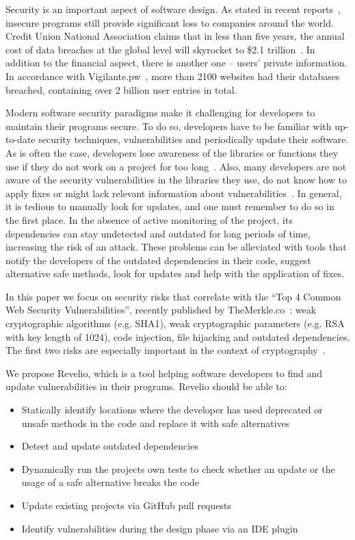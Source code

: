 Security is an important aspect of software design. As stated in recent reports~\cite{kaspersky}, insecure programs still provide significant loss to companies around the world. Credit Union National Association claims that in less than five years, the annual cost of data breaches at the global level will skyrocket to \$2.1 trillion~\cite{juniper}. In addition to the financial aspect, there is another one -- users' private information. In accordance with Vigilante.pw~\cite{vigilantpw}, more than 2100 websites had their databases breached, containing over 2 billion user entries in total.

Modern software security paradigms make it challenging for developers to maintain their programs secure. To do so, developers have to be familiar with up-to-date security techniques, vulnerabilities and periodically update their software.
As is often the case, developers lose awareness of the libraries or functions they use if they do not work on a project for too long~\cite{kula2018developers}. Also, many developers are not aware of the security vulnerabilities in the libraries they use, do not know how to apply fixes or might lack relevant information about vulnerabilities~\cite{cloudpassage}. In general, it is tedious to manually look for updates, and one must remember to do so in the first place. In the absence of active monitoring of the project, its dependencies can stay undetected and outdated for long periods of time, increasing the risk of an attack.
These problems can be alleviated with tools that notify the developers of the outdated dependencies in their code, suggest alternative safe methods, look for updates and help with the application of fixes.

In this paper we focus on security risks that correlate with the \enquote{Top 4 Common Web Security Vulnerabilities}, recently published by TheMerkle.co~\cite{merkle}: weak cryptographic algorithms (e.g. SHA1), weak cryptographic parameters (e.g. RSA with key length of 1024), code injection, file hijacking and outdated dependencies.
The first two risks are especially important in the context of cryptography~\cite{buchmann2008post}.

We propose Revelio, which is a tool helping software developers to find and update vulnerabilities in their programs.
Revelio should be able to:
\begin{itemize}
    \item Statically identify locations where the developer has used deprecated or unsafe methods in the code and replace it with safe alternatives
    \item Detect and update outdated dependencies
    \item Dynamically run the projects own tests to check whether an update or the usage of a safe alternative breaks the code
    \item Update existing projects via GitHub pull requests
    \item Identify vulnerabilities during the design phase via an IDE plugin
\end{itemize}

